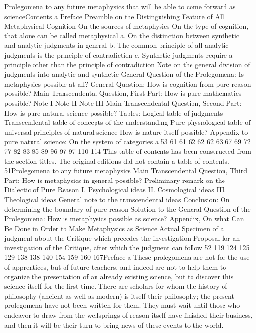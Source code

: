 Prolegomena to any future metaphysics
that will be able to come forward as scienceContents a
Preface
Preamble on the Distinguishing Feature of All Metaphysical
Cognition
On the sources of metaphysics
On the type of cognition, that alone can be
called metaphysical
a. On the distinction between synthetic and analytic
judgments in general
b. The common principle of all analytic judgments is
the principle of contradiction
c. Synthetic judgments require a principle other than
the principle of contradiction
Note on the general division of judgments into analytic
and synthetic
General Question of the Prolegomena:
Is metaphysics possible at all?
General Question:
How is cognition from pure reason possible?
Main Transcendental Question, First Part:
How is pure mathematics possible?
Note I
Note II
Note III
Main Transcendental Question, Second Part:
How is pure natural science possible?
Tables: Logical table of judgments
Transcendental table of concepts of
the understanding
Pure physiological table of universal principles
of natural science
How is nature itself possible?
Appendix to pure natural science: On the system
of categories
a
53
61
61
62
62
62
63
67
69
72
77
82
83
85
89
96
97
97
110
114
This table of contents has been constructed from the section titles. The original editions
did not contain a table of contents.
51Prolegomena to any future metaphysics
Main Transcendental Question, Third Part:
How is metaphysics in general possible?
Preliminary remark on the Dialectic of Pure Reason
I. Psychological ideas
II. Cosmological ideas
III. Theological ideas
General note to the transcendental ideas
Conclusion: On determining the boundary of pure reason
Solution to the General Question of the Prolegomena:
How is metaphysics possible as science?
Appendix, On what Can Be Done in Order to Make
Metaphysics as Science Actual
Specimen of a judgment about the Critique which precedes
the investigation
Proposal for an investigation of the Critique, after which
the judgment can follow
52
119
124
125
129
138
138
140
154
159
160
167Preface a
These prolegomena are not for the use of apprentices, but of future
teachers, and indeed are not to help them to organize the presentation
of an already existing science, but to discover this science itself for the
ﬁrst time.
There are scholars for whom the history of philosophy (ancient as
well as modern) is itself their philosophy; the present prolegomena have
not been written for them. They must wait until those who endeavor to
draw from the wellsprings of reason itself have ﬁnished their business,
and then it will be their turn to bring news of these events to the world.
